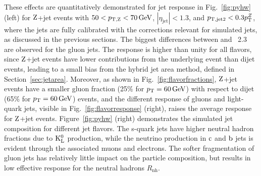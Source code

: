 \documentclass[11pt,twoside,a4paper,cmspaper,final,collab]{cms-tdr}
\begin{document}
These effects are quantitatively demonstrated for jet response in Fig.~\ref{fig:pyhw} (left) for $\mathrm{Z}$+jet events with
$50<p_\mathrm{T, Z}<70\,\text{Ge\hspace{-.08em}V}$, $|\eta_\text{jet}|<1.3$, and $p_\mathrm{T, jet2}<0.3p_{\mathrm{T}}^Z$, where the jets are fully calibrated with the corrections relevant for simulated jets, as discussed in the previous sections.
The biggest differences between  and \HERWIGpp~2.3 are observed for the gluon jets. The response is higher than unity for all flavors, since $\mathrm{Z}$+jet events have lower contributions from the underlying event
than dijet events, leading to a small bias from the hybrid jet area method, defined in Section~\ref{sec:jetarea}.
Moreover, as shown in Fig.~\ref{fig:flavorfractions}, $\mathrm{Z}$+jet events have a smaller gluon fraction (25$\%$ for $p_{\mathrm{T}}=60\,\text{Ge\hspace{-.08em}V}$) with respect to dijet (65$\%$ for $p_{\mathrm{T}}=60\,\text{Ge\hspace{-.08em}V}$) events, and the different response of gluons and light-quark jets, visible in Fig.~\ref{fig:flavorresponse} (right), raises the average response for $\mathrm{Z}$+jet events.
Figure~\ref{fig:pyhw} (right) demonstrates the simulated jet composition for different jet flavors. The s-quark jets have higher neutral hadron fractions due to $\mathrm{K^0_L}$ production, while the neutrino production in $\mathrm{c}$ and $\mathrm{b}$ jets is evident through the associated muons and electrons. The softer fragmentation of gluon jets has relatively little impact on the particle composition, but results in low effective response for the neutral hadrons $R_\mathrm{nh}$.
\end{document}
